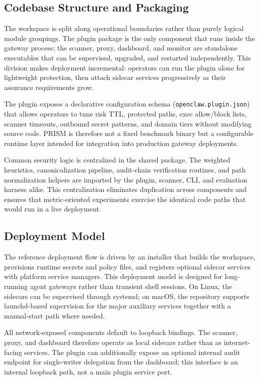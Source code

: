\subsection{Codebase Structure and Packaging}

The workspace is split along operational boundaries rather than purely logical module groupings. The plugin package is the only component that runs inside the gateway process; the scanner, proxy, dashboard, and monitor are standalone executables that can be supervised, upgraded, and restarted independently. This division makes deployment incremental: operators can run the plugin alone for lightweight protection, then attach sidecar services progressively as their assurance requirements grow.

The plugin exposes a declarative configuration schema (\texttt{openclaw.plugin.json}) that allows operators to tune risk TTL, protected paths, exec allow/block lists, scanner timeouts, outbound secret patterns, and domain tiers without modifying source code. PRISM is therefore not a fixed benchmark binary but a configurable runtime layer intended for integration into production gateway deployments.

Common security logic is centralized in the shared package. The weighted heuristics, canonicalization pipeline, audit-chain verification routines, and path normalization helpers are imported by the plugin, scanner, CLI, and evaluation harness alike. This centralization eliminates duplication across components and ensures that metric-oriented experiments exercise the identical code paths that would run in a live deployment.

\subsection{Deployment Model}

The reference deployment flow is driven by an installer that builds the workspace, provisions runtime secrets and policy files, and registers optional sidecar services with platform service managers. This deployment model is designed for long-running agent gateways rather than transient shell sessions. On Linux, the sidecars can be supervised through systemd; on macOS, the repository supports launchd-based supervision for the major auxiliary services together with a manual-start path where needed.

All network-exposed components default to loopback bindings. The scanner, proxy, and dashboard therefore operate as local sidecars rather than as internet-facing services. The plugin can additionally expose an optional internal audit endpoint for single-writer delegation from the dashboard; this interface is an internal loopback path, not a main plugin service port.

